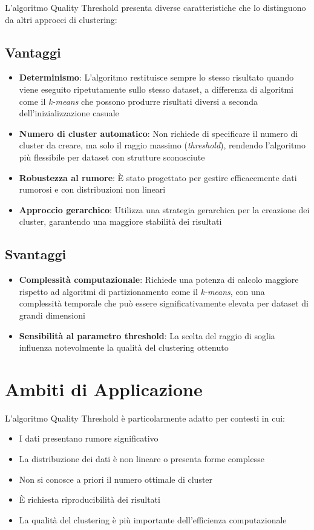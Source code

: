 \documentclass{article}
\begin{document}
L'algoritmo Quality Threshold presenta diverse caratteristiche che lo distinguono da altri approcci di clustering:

\subsection{Vantaggi}

\begin{itemize}
\item \textbf{Determinismo}: L'algoritmo restituisce sempre lo stesso risultato quando viene eseguito ripetutamente sullo stesso dataset, a differenza di algoritmi come il \textit{k-means} che possono produrre risultati diversi a seconda dell'inizializzazione casuale
\item \textbf{Numero di cluster automatico}: Non richiede di specificare il numero di cluster da creare, ma solo il raggio massimo (\textit{threshold}), rendendo l'algoritmo più flessibile per dataset con strutture sconosciute
\item \textbf{Robustezza al rumore}: È stato progettato per gestire efficacemente dati rumorosi e con distribuzioni non lineari
\item \textbf{Approccio gerarchico}: Utilizza una strategia gerarchica per la creazione dei cluster, garantendo una maggiore stabilità dei risultati
\end{itemize}

\subsection{Svantaggi}

\begin{itemize}
\item \textbf{Complessità computazionale}: Richiede una potenza di calcolo maggiore rispetto ad algoritmi di partizionamento come il \textit{k-means}, con una complessità temporale che può essere significativamente elevata per dataset di grandi dimensioni
\item \textbf{Sensibilità al parametro threshold}: La scelta del raggio di soglia influenza notevolmente la qualità del clustering ottenuto
\end{itemize}

\section{Ambiti di Applicazione}

L'algoritmo Quality Threshold è particolarmente adatto per contesti in cui:

\begin{itemize}
\item I dati presentano rumore significativo
\item La distribuzione dei dati è non lineare o presenta forme complesse
\item Non si conosce a priori il numero ottimale di cluster
\item È richiesta riproducibilità dei risultati
\item La qualità del clustering è più importante dell'efficienza computazionale
\end{itemize}
\end{document}
